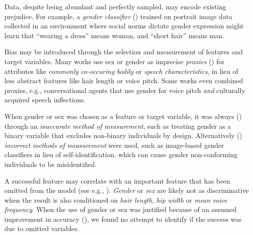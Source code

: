 \documentclass[sigconf,balance=false]{acmart}
\begin{document}
 Data, despite being abundant and perfectly sampled, may encode existing prejudice. For example, a \emph{gender classifier} (\classifier) trained on portrait image data collected in an environment where social norms dictate gender expression might learn that ``wearing a dress'' means woman, and ``short hair'' means man.

 Bias may be introduced through the selection and measurement of features and target variables.
Many works use sex or gender as imprecise \emph{proxies} (\var) for attributes like \emph{commonly co-occuring bodily} or \emph{speech characteristics}, in lieu of less abstract features like hair length or voice pitch. Some works even combined proxies, e.g., conversational agents that use gender for voice pitch \emph{and} culturally acquired speech inflections.

When gender or sex was chosen as a feature or target variable, it was always (\binary) through an \emph{inaccurate method of measurement}, such as treating gender as a binary variable that excludes non-binary individuals by design. Alternatively (\classifier) \emph{incorrect methods of measurement} were used, such as image-based gender classifiers in lieu of self-identification, which can cause gender non-conforming individuals to be misidentified.

 A successful feature may correlate with an important feature that has been omitted from the model (see e.g., \cite{clarke2005phantom}). \emph{Gender} or \emph{sex} are likely not as discriminative when the result is also conditioned on \emph{hair length}, \emph{hip width} or \emph{mean voice frequency}. When the use of gender or sex was justified because of an assumed improvement in accuracy (\var), we found no attempt to identify if the success was due to omitted variables.
\end{document}
